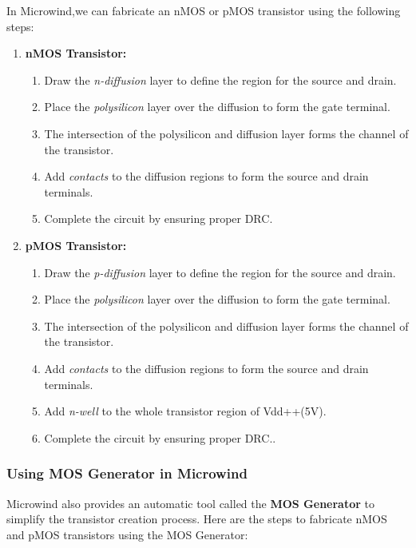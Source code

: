 \documentclass[a4paper,12pt]{article}
\begin{document}
	In Microwind,we can fabricate an nMOS or pMOS transistor using the following steps:
	
	\begin{enumerate}
		\item \textbf{nMOS Transistor:}
		\begin{enumerate}
			\item Draw the \textit{n-diffusion} layer to define the region for the source and drain.
			\item Place the \textit{polysilicon} layer over the diffusion to form the gate terminal.
			\item The intersection of the polysilicon and diffusion layer forms the channel of the transistor.
			\item Add \textit{contacts} to the diffusion regions to form the source and drain terminals.
			\item Complete the circuit by ensuring proper DRC.
		\end{enumerate}
		
		\item \textbf{pMOS Transistor:}
		\begin{enumerate}
			\item Draw the \textit{p-diffusion} layer to define the region for the source and drain.
			\item Place the \textit{polysilicon} layer over the diffusion to form the gate terminal.
			\item The intersection of the polysilicon and diffusion layer forms the channel of the transistor.
			\item Add \textit{contacts} to the diffusion regions to form the source and drain terminals.
			\item Add \textit{n-well} to the whole transistor region of Vdd++(5V).
			\item Complete the circuit by ensuring proper DRC..
		\end{enumerate}
	\end{enumerate}
	
	\subsubsection{Using MOS Generator in Microwind}
	
	Microwind also provides an automatic tool called the \textbf{MOS Generator} to simplify the transistor creation process. Here are the steps to fabricate nMOS and pMOS transistors using the MOS Generator:
	
\end{document}
